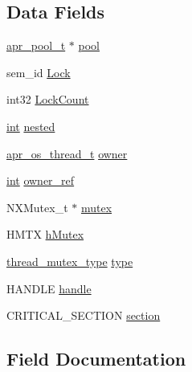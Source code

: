 \subsection*{Data Fields}
\begin{DoxyCompactItemize}
\item 
\hyperlink{structapr__pool__t}{apr\+\_\+pool\+\_\+t} $\ast$ \hyperlink{structapr__thread__mutex__t_acbde1f1ab5bfad771024beb222439540}{pool}
\item 
sem\+\_\+id \hyperlink{structapr__thread__mutex__t_a6ffc882dbf4acf912baae67a1514b26d}{Lock}
\item 
int32 \hyperlink{structapr__thread__mutex__t_a3e8009fdfb54c72bc4d252486f131fa1}{Lock\+Count}
\item 
\hyperlink{pcre_8txt_a42dfa4ff673c82d8efe7144098fbc198}{int} \hyperlink{structapr__thread__mutex__t_ad3ad636b850e7da65ac876d30f5bf467}{nested}
\item 
\hyperlink{group__apr__portabile_ga4ccd9519af148ccf9cff850dd58f00b6}{apr\+\_\+os\+\_\+thread\+\_\+t} \hyperlink{structapr__thread__mutex__t_aa13a29023bf3320da5eeb643e3e8c4de}{owner}
\item 
\hyperlink{pcre_8txt_a42dfa4ff673c82d8efe7144098fbc198}{int} \hyperlink{structapr__thread__mutex__t_a4a95216b24543575da93a59de1e65398}{owner\+\_\+ref}
\item 
N\+X\+Mutex\+\_\+t $\ast$ \hyperlink{structapr__thread__mutex__t_a8ef81444858cb3730a3f4d0f0f18e4af}{mutex}
\item 
H\+M\+TX \hyperlink{structapr__thread__mutex__t_afd734c4a884997eaf8a9b701cfa603f7}{h\+Mutex}
\item 
\hyperlink{win32_2apr__arch__thread__mutex_8h_a0a811924c897d42acfab7798d8681a09}{thread\+\_\+mutex\+\_\+type} \hyperlink{structapr__thread__mutex__t_a3b96f37b2e946e6308b4cac3d72fecc7}{type}
\item 
H\+A\+N\+D\+LE \hyperlink{structapr__thread__mutex__t_a7849918c2f84bd5bc5d79309707abe3c}{handle}
\item 
C\+R\+I\+T\+I\+C\+A\+L\+\_\+\+S\+E\+C\+T\+I\+ON \hyperlink{structapr__thread__mutex__t_a67f2e859a45c82fb49b78ff4a68032f8}{section}
\end{DoxyCompactItemize}


\subsection{Field Documentation}
